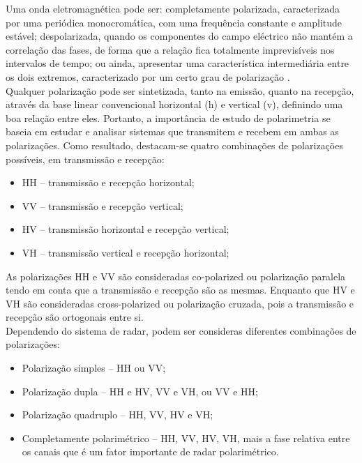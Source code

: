 \documentclass[a4paper,12pt]{article}
\begin{document}
Uma onda eletromagnética pode ser: completamente polarizada, caracterizada por uma periódica monocromática, com uma frequência constante e amplitude estável; despolarizada, quando os componentes do campo eléctrico não mantém a correlação das fases, de forma que a relação fica totalmente imprevisíveis nos intervalos de tempo; ou ainda, apresentar uma característica intermediária entre os dois extremos, caracterizado por um certo grau de polarização \cite{nilosergio2012}.\\

Qualquer polarização pode ser sintetizada, tanto na emissão, quanto na recepção, através da base linear convencional horizontal (h) e vertical (v), definindo uma boa relação entre eles. Portanto, a importância de estudo de polarimetria se baseia em estudar e analisar sistemas que transmitem e recebem em ambas as polarizações. Como resultado, destacam-se quatro combinações de polarizações possíveis, em transmissão e recepção:

\begin{itemize}
    \item HH – transmissão e recepção horizontal;
    \item VV – transmissão e recepção vertical;
    \item HV – transmissão horizontal e recepção vertical;
    \item VH – transmissão vertical e recepção horizontal;
\end{itemize}

As polarizações HH e VV são consideradas co-polarized ou polarização paralela tendo em conta que a transmissão e recepção são as mesmas. Enquanto que HV e VH são consideradas cross-polarized ou polarização cruzada, pois a transmissão e recepção são ortogonais entre si.\\

Dependendo do sistema de radar, podem ser consideras diferentes combinações de polarizações:

\begin{itemize}
    \item Polarização simples – HH ou VV;
    \item Polarização dupla – HH e HV, VV e VH, ou VV e HH;
    \item Polarização quadruplo  – HH, VV, HV e VH;
    \item Completamente polarimétrico –  HH, VV, HV, VH, mais a fase relativa entre os canais que é um fator importante de radar polarimétrico.
\end{itemize}
\end{document}
